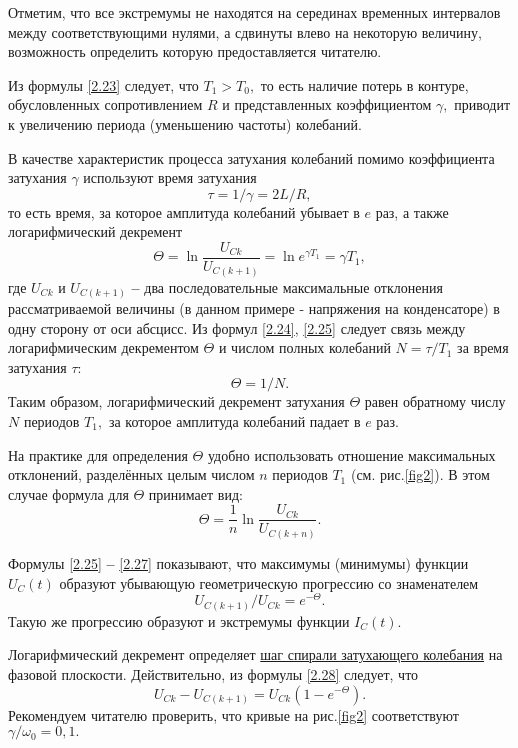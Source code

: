 Отметим, что все экстремумы не находятся на серединах временных интервалов между соответствующими нулями, а сдвинуты влево на некоторую величину, возможность определить которую предоставляется читателю.

Из формулы \eqref{2.23} следует, что $T_1>T_0,$ то есть наличие потерь в контуре, обусловленных сопротивлением $R$ и представленных коэффициентом $\gamma,$ приводит к увеличению периода (уменьшению частоты) колебаний.

В качестве характеристик процесса затухания колебаний помимо коэффициента затухания $\gamma$ используют \textsf{время затухания}
\begin{equation}\label{2.24}
\tau=1/\gamma=2L/R,
\end{equation}
то есть время, за которое амплитуда колебаний убывает в $e$ раз, а также \textsf{логарифмический дек\-ремент}
\begin{equation}\label{2.25}
\Theta=\ln\dfrac{U_{Ck}}{U_{C(k+1)}}=\ln e^{\gamma T_1}=\gamma T_1,
\end{equation}
где $U_{Ck}$ и $U_{C(k+1)}$ \textbf{--} два последовательные максимальные отклонения рассматриваемой вели\-чины (в данном примере - напряжения на конденсаторе) в одну сторону от оси абсцисс. Из формул \eqref{2.24}, \eqref{2.25} следует связь между логарифмическим декрементом $\Theta$ и числом полных колебаний $N=\tau/T_1$ за время затухания $\tau:$
\begin{equation}\label{2.26}
\Theta=1/N.
\end{equation}
Таким образом, логарифмический декремент затухания $\Theta$ равен обратному числу $N$ периодов  $T_1,$ за которое амплитуда колебаний падает в $e$ раз.
 
На практике для определения $\Theta$ удобно использовать отношение максимальных отклонений, разделённых целым числом $n$ периодов $T_1$ (см. рис.\ref{fig2}). В этом случае формула для $\Theta$ принимает вид:
\begin{equation}\label{2.27}
\Theta=\dfrac{1}{n}\ln\dfrac{U_{Ck}}{U_{C(k+n)}}.
\end{equation}

Формулы \eqref{2.25} \textbf{--} \eqref{2.27} показывают, что максимумы (минимумы) функции $U_C(t)$ образуют убывающую геометрическую прогрессию со знаменателем
\begin{equation}\label{2.28}
U_{C(k+1)}/U_{Ck}=e^{-\Theta}.
\end{equation}
Такую же прогрессию образуют и экстремумы функции $I_C(t).$

Логарифмический декремент определяет \underline{шаг спи\-ра\-ли за\-ту\-ха\-ю\-ще\-го ко\-ле\-ба\-ния} на фазовой плоскости. Действительно, из формулы \eqref{2.28} следует, что
\begin{equation}\label{2.29}
U_{Ck}-U_{C(k+1)}=U_{Ck}\left(1-e^{-\Theta}\right).
\end{equation}
Рекомендуем читателю проверить, что кривые на рис.\ref{fig2} соответствуют $\gamma/\omega_0=0,1.$

